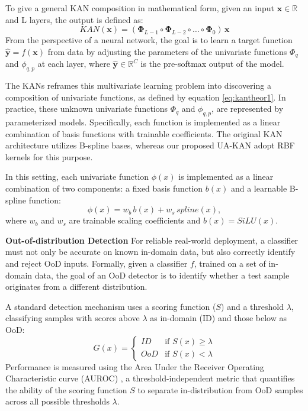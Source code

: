 \documentclass[conference]{IEEEtran}
\begin{document}
To give a general KAN composition in mathematical form, given an input $\mathbf{x}\in \mathbb{R}$ and L layers, the output is defined as:
\begin{equation} \label{eq:kancomposition}
KAN(\mathbf{x}) = (\mathbf{\Phi}_{L-1}\circ\mathbf{\Phi}_{L-2}\circ\dots\circ\mathbf{\Phi}_{0})\,\mathbf{x}
\end{equation}
From the perspective of a neural network, the goal is to learn a target function $\mathbf{\hat{y}} = f(\mathbf{x})$ from data by adjusting the parameters of the univariate functions $\Phi_q$ and $\phi_{q,p}$ at each layer, where $\hat{\mathbf{y}}\in \mathbb{R}^C$ is the pre-softmax output of the model.


The KANs reframes this multivariate learning problem into discovering a composition of univariate functions, as defined by equation \ref{eq:kantheor1}. In practice, these unknown univariate functions $\Phi_q$ and $\phi_{q,p}$, are represented by parameterized models. Specifically, each function is implemented as a linear combination of basis functions with trainable coefficients. The original KAN architecture utilizes B-spline bases, whereas our proposed UA-KAN adopt RBF kernels for this purpose.



In this setting, each univariate function $\phi(x)$ is implemented as a linear combination of two components: a fixed basis function $b(x)$ and a learnable B-spline function:
\begin{equation} \label{eq:kanimplement}
\phi(x) = w_b \, b(x) + w_s \, spline(x),
\end{equation}
where $w_b$ and $w_s$ are trainable scaling coefficients and $b(x) = SiLU(x)$.


\noindent \textbf{Out-of-distribution Detection} For reliable real-world deployment, a classifier must not only be accurate on known in-domain data, but also correctly identify and reject OoD inputs. Formally, given a classifier $f$, trained on a set of in-domain data, the goal of an OoD detector is to identify whether a test sample originates from a different distribution. 

A standard detection mechanism uses a scoring function ($S$) and a threshold $\lambda$, classifying samples with scores above $\lambda$ as in-domain (ID) and those below as OoD:
\begin{equation}
\label{eq:oodthreshold}
G(x) = \begin{cases}
ID &\text{if $S(x) \ge \lambda$}\\
OoD &\text{if $S(x) < \lambda$}
\end{cases}
\end{equation}
Performance is measured using the Area Under the Receiver Operating Characteristic curve (AUROC) \cite{10.1007/978-3-031-78201-5_4}, a threshold-independent metric that quantifies the ability of the scoring function $S$ to separate in-distribution from OoD samples across all possible thresholds $\lambda$.
\end{document}
